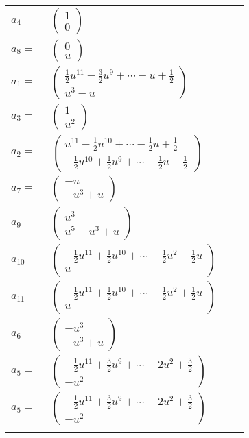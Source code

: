 \documentclass[1p]{elsarticle_modified}
\theoremstyle{definition}
\begin{document}
\begin{tabular}{m{7pt} m{180pt} m{7pt} m{180pt} }
\flushright $a_{4}=$&$\begin{pmatrix}1\\0\end{pmatrix}$ \\
\flushright $a_{8}=$&$\begin{pmatrix}0\\u\end{pmatrix}$ \\
\flushright $a_{1}=$&$\begin{pmatrix}\frac{1}{2} u^{11}-\frac{3}{2} u^9+\cdots- u+\frac{1}{2}\\u^3- u\end{pmatrix}$ \\
\flushright $a_{3}=$&$\begin{pmatrix}1\\u^2\end{pmatrix}$ \\
\flushright $a_{2}=$&$\begin{pmatrix}u^{11}-\frac{1}{2} u^{10}+\cdots-\frac{1}{2} u+\frac{1}{2}\\-\frac{1}{2} u^{10}+\frac{1}{2} u^9+\cdots-\frac{1}{2} u-\frac{1}{2}\end{pmatrix}$ \\
\flushright $a_{7}=$&$\begin{pmatrix}- u\\- u^3+u\end{pmatrix}$ \\
\flushright $a_{9}=$&$\begin{pmatrix}u^3\\u^5- u^3+u\end{pmatrix}$ \\
\flushright $a_{10}=$&$\begin{pmatrix}-\frac{1}{2} u^{11}+\frac{1}{2} u^{10}+\cdots-\frac{1}{2} u^2-\frac{1}{2} u\\u\end{pmatrix}$ \\
\flushright $a_{11}=$&$\begin{pmatrix}-\frac{1}{2} u^{11}+\frac{1}{2} u^{10}+\cdots-\frac{1}{2} u^2+\frac{1}{2} u\\u\end{pmatrix}$ \\
\flushright $a_{6}=$&$\begin{pmatrix}- u^3\\- u^3+u\end{pmatrix}$ \\
\flushright $a_{5}=$&$\begin{pmatrix}-\frac{1}{2} u^{11}+\frac{3}{2} u^9+\cdots-2 u^2+\frac{3}{2}\\- u^2\end{pmatrix}$\\ \flushright $a_{5}=$&$\begin{pmatrix}-\frac{1}{2} u^{11}+\frac{3}{2} u^9+\cdots-2 u^2+\frac{3}{2}\\- u^2\end{pmatrix}$\\&\end{tabular}
\end{document}
